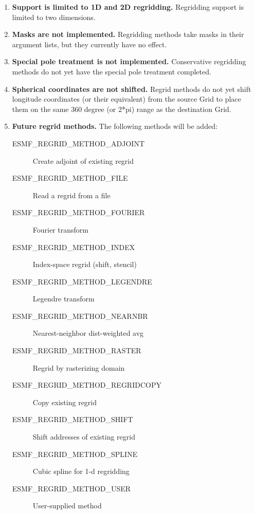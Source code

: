 

\begin{enumerate}

\item {\bf Support is limited to 1D and 2D regridding.}  Regridding
support is limited to two dimensions.

\item {\bf Masks are not implemented.}  Regridding methods take
masks in their argument lists, but they currently have no effect.

\item {\bf Special pole treatment is not implemented.}
Conservative regridding methods do not yet have the special pole
treatment completed.

\item {\bf Spherical coordinates are not shifted.}
 Regrid methods do not yet shift longitude coordinates
(or their equivalent) from the source Grid to place them on the same
360 degree (or 2*pi) range as the destination Grid. 

\item {\bf Future regrid methods.}  The following methods will
be added:
 \begin{description}
   \item [ESMF\_REGRID\_METHOD\_ADJOINT]
         Create adjoint of existing regrid
   \item [ESMF\_REGRID\_METHOD\_FILE]
         Read a regrid from a file
   \item [ESMF\_REGRID\_METHOD\_FOURIER]
         Fourier transform
   \item [ESMF\_REGRID\_METHOD\_INDEX]
         Index-space regrid (shift, stencil)
   \item [ESMF\_REGRID\_METHOD\_LEGENDRE]
         Legendre transform
   \item [ESMF\_REGRID\_METHOD\_NEARNBR]
         Nearest-neighbor dist-weighted avg
   \item [ESMF\_REGRID\_METHOD\_RASTER]
         Regrid by rasterizing domain
   \item [ESMF\_REGRID\_METHOD\_REGRIDCOPY]
         Copy existing regrid
   \item [ESMF\_REGRID\_METHOD\_SHIFT]
         Shift addresses of existing regrid
   \item [ESMF\_REGRID\_METHOD\_SPLINE]
         Cubic spline for 1-d regridding
   \item [ESMF\_REGRID\_METHOD\_USER]
         User-supplied method
  \end{description}

\end{enumerate}


